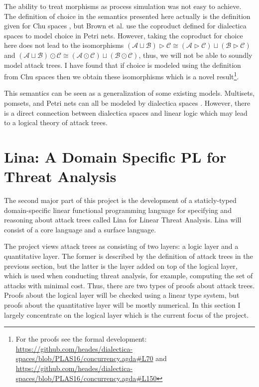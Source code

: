 \documentclass{llncs}
\newcommand{\cat}[1]{\mathcal{#1}}
\begin{document}
The ability to treat morphisms as process simulation was not easy to
achieve.  The definition of choice in the semantics presented here
actually is the definition given for Chu spaces \cite{Gupta:1994}, but
Brown et al. use the coproduct defined for dialectica spaces to model
choice in Petri nets.  However, taking the coproduct for choice here
does not lead to the isomorphisms $(\cat{A} \sqcup \cat{B}) \rhd
\cat{C} \cong (\cat{A} \rhd \cat{C}) \sqcup (\cat{B} \rhd \cat{C})$
and $(\cat{A} \sqcup \cat{B}) \odot \cat{C} \cong (\cat{A} \odot
\cat{C}) \sqcup (\cat{B} \odot \cat{C})$, thus, we will not be able to
soundly model attack trees.  I have found that if choice is modeled
using the definition from Chu spaces \cite{Gupta:1994} then we obtain
these isomorphisms which is a novel result\footnote{For the proofs see
  the formal development:
  \url{https://github.com/heades/dialectica-spaces/blob/PLAS16/concurrency.agda\#L70}
  and
  \url{https://github.com/heades/dialectica-spaces/blob/PLAS16/concurrency.agda\#L150}}.

This semantics can be seen as a generalization of some existing
models.  Multisets, pomsets, and Petri nets can all be modeled by
dialectica spaces \cite{Brown:1991,Gupta:1994}.  However, there is a
direct connection between dialectica spaces and linear logic which
may lead to a logical theory of attack trees.

\section{Lina: A Domain Specific PL for Threat Analysis}
\label{sec:lina:_a_domain_specific_pl_for_threat_analysis}

The second major part of this project is the development of a
staticly-typed domain-specific linear functional programming language
for specifying and reasoning about attack trees called Lina for Linear
Threat Analysis.  Lina will consist of a core language and a surface
language.

The project views attack trees as consisting of two layers: a logic
layer and a quantitative layer.  The former is described by the
definition of attack trees in the previous section, but the latter is
the layer added on top of the logical layer, which is used when
conducting threat analysis, for example, computing the set of attacks
with minimal cost.  Thus, there are two types of proofs about attack
trees.  Proofs about the logical layer will be checked using a linear
type system, but proofs about the quantitative layer will be mostly
numerical. In this section I largely concentrate on the logical layer
which is the current focus of the project.
\end{document}
